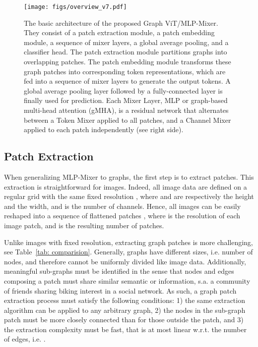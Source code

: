 \documentclass{article}
\begin{document}
\begin{figure}[t]
    \centering
    \texttt{[image: figs/overview\_v7.pdf]}
    \caption{
    The basic architecture of the proposed Graph ViT/MLP-Mixer. They consist of a patch extraction module, a patch embedding module, a sequence of mixer layers, a global average pooling, and a classifier head. The patch extraction module partitions graphs into overlapping patches. The patch embedding module transforms these graph patches into corresponding token representations, which are fed into a sequence of mixer layers to generate the output tokens. A global average pooling layer followed by a fully-connected layer is finally used for prediction. Each Mixer Layer, MLP or graph-based multi-head attention (gMHA), is a residual network that alternates between a Token Mixer applied to all patches, and a Channel Mixer applied to each patch independently (see right side).
    }
    \label{fig: overview}
\end{figure}

\subsection{Patch Extraction}
\label{sec:metis}



When generalizing MLP-Mixer to graphs, the first step is to extract patches. This extraction is straightforward for images. Indeed, all image data  are defined on a regular grid with the same fixed resolution , where  and  are respectively the height and the width, and  is the number of channels. Hence, all images can be easily reshaped into a sequence of flattened patches , where  is the resolution of each image patch, and  is the resulting number of patches.



Unlike images with fixed resolution, extracting graph patches is more challenging, see Table~\ref{tab: comparision}. Generally, graphs have different sizes, i.e. number of nodes, and therefore cannot be uniformly divided like image data. Additionally, meaningful sub-graphs must be identified in the sense that nodes and edges composing a patch must share similar semantic or information, s.a. a community of friends sharing biking interest in a social network. As such, a graph patch extraction process must satisfy the following conditions: 1) the same extraction algorithm can be applied to any arbitrary graph, 2) the nodes in the sub-graph patch must be more closely connected than for those outside the patch, and 3) the extraction complexity must be fast, that is at most linear w.r.t. the number of edges, i.e. .
\end{document}
